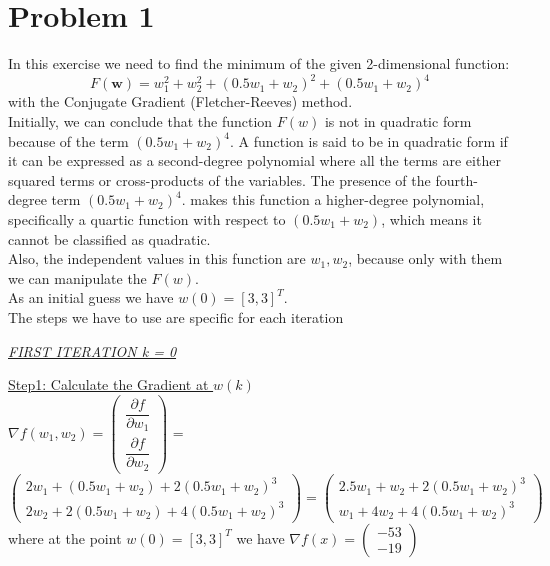 \section{Problem 1}
In this exercise we need to find the minimum of the given 2-dimensional function:\\
\begin{equation}	
		F(\mathbf{w})=w_{1}^{2}+w_{2}^{2}+(0.5w_{1}+w_{2})^{2}+(0.5w_{1}+w_{2})^{4}	
\end{equation}
with the Conjugate Gradient (Fletcher-Reeves) method.\\

Initially, we can conclude that the function $F(w)$ is not in quadratic form because of the term $(0.5w_{1}+w_{2})^{4}$.
A function is said to be in quadratic form if it can be expressed as a second-degree polynomial where all the terms are either squared terms or cross-products of the variables. The presence of the fourth-degree term $(0.5w_{1}+w_{2})^{4}$.
makes this function a higher-degree polynomial, specifically a quartic function with respect to $(0.5w_{1}+w_{2})$, which means it cannot be classified as quadratic.\\
Also, the independent values in this function are $w_{1},w_{2}$, because only with them we can manipulate the $F(w)$.\\

As an initial guess we have $w\left(0\right) = \left[3, 3\right]^T$.\\
Τhe steps we have to use are specific for each iteration

\begin{center}
	\underline{\textit{FIRST ITERATION k = 0}}
\end{center}

\underline{Step1: Calculate the Gradient at  $w\left(k\right)$ }\\
\(\nabla f(w_1,w_2) = \left(\begin{array}{c}
	\dfrac{\partial f}{\partial w_1} \\[4mm]
	\dfrac{\partial f}{\partial w_2}
\end{array}\right)\) = $\left(\begin{array}{c}
	2w_1 + (0.5w_1+w_2) + 2(0.5w_1+w_2)^3\\[1mm]
	2w_2 + 2(0.5w_1+w_2) + 4(0.5w_1+w_2)^3
\end{array}\right) = \left(\begin{array}{c}
	2.5w_1 + w_2 + 2(0.5w_1+w_2)^3\\[1mm]
	w_1 + 4w_2 + 4(0.5w_1+w_2)^3
\end{array}\right)$ \\[3mm]

where at the point $w\left(0\right) = \left[3, 3\right]^T$ we have $\nabla f(x) = \left(\begin{array}{c}
	-53 \\
	-19
\end{array}\right)$
\\[4mm]

